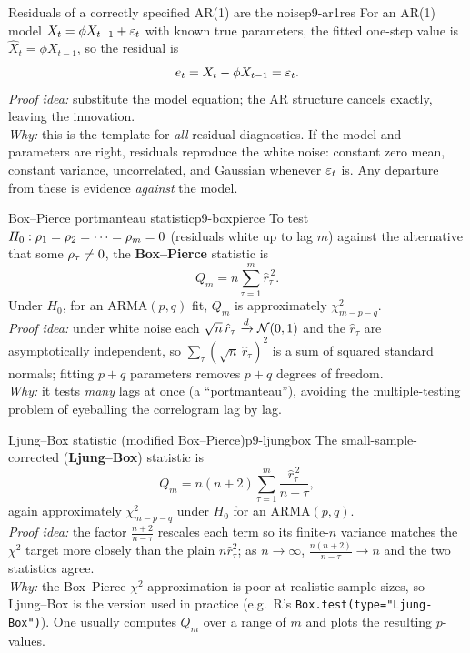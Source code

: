 \begin{proposition}{Residuals of a correctly specified AR(1) are the noise}{p9-ar1res}
For an AR(1) model $X_t=\phi X_{t-1}+\varepsilon_t$ with known true parameters, the
fitted one-step value is $\hat X_t=\phi X_{t-1}$, so the residual is
\[
e_t = X_t - \phi X_{t-1} = \varepsilon_t .
\]
\textit{Proof idea:} substitute the model equation; the AR structure cancels
exactly, leaving the innovation.\\
\textit{Why:} this is the template for \emph{all} residual diagnostics. If the
model and parameters are right, residuals reproduce the white noise: constant
zero mean, constant variance, uncorrelated, and Gaussian whenever $\varepsilon_t$ is.
Any departure from these is evidence \emph{against} the model.
\end{proposition}

\begin{proposition}{Box--Pierce portmanteau statistic}{p9-boxpierce}
To test $H_0:\rho_1=\rho_2=\cdots=\rho_m=0$ (residuals white up to lag $m$)
against the alternative that some $\rho_\tau\ne0$, the \textbf{Box--Pierce}
statistic is
\[
Q_m = n\sum_{\tau=1}^{m}\hat r_\tau^{\,2}.
\]
Under $H_0$, for an ARMA$(p,q)$ fit, $Q_m$ is approximately
$\chi^2_{m-p-q}$.\\
\textit{Proof idea:} under white noise each $\sqrt n\,\hat r_\tau\xrightarrow{d}
\mathcal N(0,1)$ and the $\hat r_\tau$ are asymptotically independent, so
$\sum_\tau(\sqrt n\,\hat r_\tau)^2$ is a sum of squared standard normals; fitting
$p+q$ parameters removes $p+q$ degrees of freedom.\\
\textit{Why:} it tests \emph{many} lags at once (a ``portmanteau''), avoiding the
multiple-testing problem of eyeballing the correlogram lag by lag.
\end{proposition}

\begin{proposition}{Ljung--Box statistic (modified Box--Pierce)}{p9-ljungbox}
The small-sample-corrected (\textbf{Ljung--Box}) statistic is
\[
Q_m = n(n+2)\sum_{\tau=1}^{m}\frac{\hat r_\tau^{\,2}}{n-\tau},
\]
again approximately $\chi^2_{m-p-q}$ under $H_0$ for an ARMA$(p,q)$.\\
\textit{Proof idea:} the factor $\frac{n+2}{n-\tau}$ rescales each term so its
finite-$n$ variance matches the $\chi^2$ target more closely than the plain
$n\hat r_\tau^2$; as $n\to\infty$, $\frac{n(n+2)}{n-\tau}\to n$ and the two
statistics agree.\\
\textit{Why:} the Box--Pierce $\chi^2$ approximation is poor at realistic sample
sizes, so Ljung--Box is the version used in practice (e.g.\ R's
\texttt{Box.test(type="Ljung-Box")}). One usually computes $Q_m$ over a range of
$m$ and plots the resulting $p$-values.
\end{proposition}

